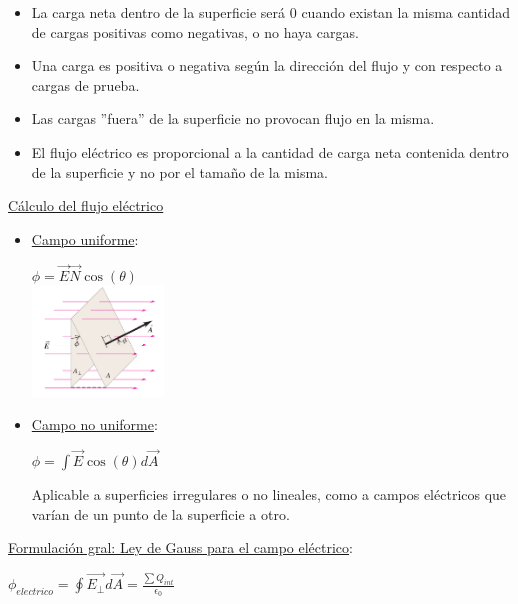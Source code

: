 \documentclass[a4paper]{article}
\newcommand{\saltoPag}{\newpage \noindent \thispagestyle{fancy}}
\begin{document}
\begin{multicols}{2}
                    \begin{itemize}
                        \item La carga neta dentro de la superficie será 0 cuando existan la misma cantidad de cargas positivas como negativas, o no haya cargas.
                        \item Una carga es positiva o negativa según la dirección del flujo y con respecto a cargas de prueba.
                        \item Las cargas ''fuera'' de la superficie no provocan flujo en la misma.
                        \item El flujo eléctrico es proporcional a la cantidad de carga neta contenida dentro de la superficie y no por el tamaño de la misma.
                    \end{itemize}
                \underline{Cálculo del flujo eléctrico} 
                    \begin{itemize}
                        \item \underline{Campo uniforme}: \begin{center} $\phi = \vec{E} \vec{N} \cos(\theta)$ \\[10pt] \includegraphics[width=3.5cm]{../imagenes/flujoCampoElectricoUniforme.png} \end{center} 
                        \saltoPag
                        \item \underline{Campo no uniforme}: \begin{center} $\phi = \int \vec{E}\cos(\theta)d\vec{A}$ \\[10pt]\end{center} \indent Aplicable a superficies irregulares o no lineales, como a campos eléctricos que varían de un punto de la superficie a otro.
                    \end{itemize}
                \underline{Formulación gral: Ley de Gauss para el campo eléctrico}: 
                    \begin{center} $\phi_{electrico} = \oint \vec{E_\perp}d\vec{A} = \frac{\sum Q_{int}}{\epsilon_0}$ \end{center}
                    \begin{itemize}

\end{itemize}
\end{multicols}
\end{document}
